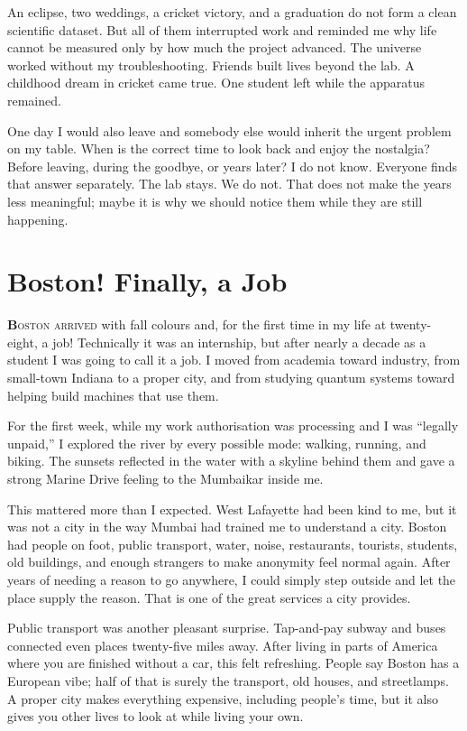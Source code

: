 \documentclass[11pt,twoside,openany]{book}
\newcommand{\dropcap}[2]{\lettrine[lines=3,findent=2pt,nindent=4pt]{\color{accent}\textsf{\textbf{#1}}}{#2}}
\begin{document}
An eclipse, two weddings, a cricket victory, and a graduation do not form a
clean scientific dataset. But all of them interrupted work and reminded me
why life cannot be measured only by how much the project advanced. The
universe worked without my troubleshooting. Friends built lives beyond the
lab. A childhood dream in cricket came true. One student left while the
apparatus remained.

One day I would also leave and somebody else would inherit the urgent problem
on my table. When is the correct time to look back and enjoy the nostalgia?
Before leaving, during the goodbye, or years later? I do not know. Everyone
finds that answer separately. The lab stays. We do not. That does not make the
years less meaningful; maybe it is why we should notice them while they are
still happening.

\chapter{Boston! Finally, a Job}

\dropcap{B}{oston arrived} with fall colours and, for the first time in my
life at twenty-eight, a job! Technically it was an internship, but after
nearly a decade as a student I was going to call it a job. I moved from
academia toward industry, from small-town Indiana to a proper city, and from
studying quantum systems toward helping build machines that use them.

For the first week, while my work authorisation was processing and I was
``legally unpaid,'' I explored the river by every possible mode: walking,
running, and biking. The sunsets reflected in the water with a skyline behind
them and gave a strong Marine Drive feeling to the Mumbaikar inside me.

This mattered more than I expected. West Lafayette had been kind to me, but it
was not a city in the way Mumbai had trained me to understand a city. Boston
had people on foot, public transport, water, noise, restaurants, tourists,
students, old buildings, and enough strangers to make anonymity feel normal
again. After years of needing a reason to go anywhere, I could simply step
outside and let the place supply the reason. That is one of the great
services a city provides.

Public transport was another pleasant surprise. Tap-and-pay subway and buses
connected even places twenty-five miles away. After living in parts of America
where you are finished without a car, this felt refreshing. People say Boston
has a European vibe; half of that is surely the transport, old houses, and
streetlamps. A proper city makes everything expensive, including people's
time, but it also gives you other lives to look at while living your own.
\end{document}
